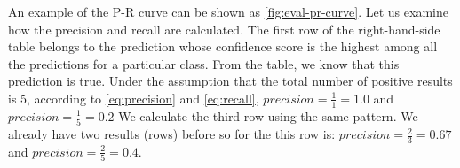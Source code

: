 
An example of the P-R curve can be shown as \autoref{fig:eval-pr-curve}. Let us
examine how the precision and recall are calculated. The first row of the
right-hand-side table belongs to the prediction whose confidence score is the
highest among all the predictions for a particular class. From the table, we
know that this prediction is true.
Under the assumption that the total number of positive results is 5,
according to \autoref{eq:precision} and \autoref{eq:recall},
$precision = \frac{1}{1}=1.0$ and $precision = \frac{1}{5}=0.2$
We calculate the third row using the same pattern. We already have two results (rows) before
so for the this row is:
$precision = \frac{2}{3}=0.67$ and $precision = \frac{2}{5}=0.4$.


